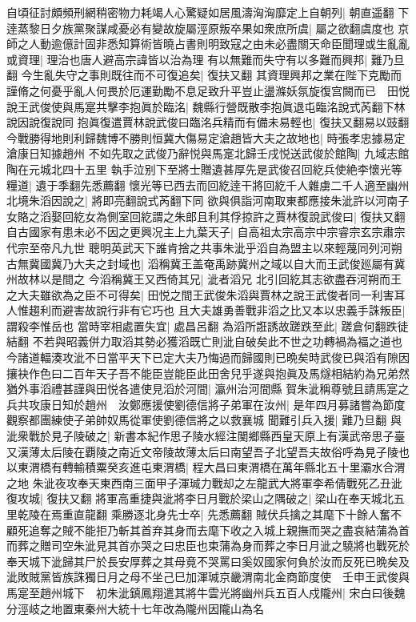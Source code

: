 自頃征討頗頻刑網稍密物力耗竭人心驚疑如居風濤洶洶靡定上自朝列|{
	朝直遥翻}
下逹蒸黎日夕族黨聚謀咸憂必有變故旋屬涇原叛卒果如衆庶所虞|{
	屬之欲翻虞度也}
京師之人動逾億計固非悉知算術皆曉占書則明致寇之由未必盡關天命臣聞理或生亂亂或資理|{
	理治也唐人避高宗諱皆以治為理}
有以無難而失守有以多難而興邦|{
	難乃旦翻}
今生亂失守之事則既往而不可復追矣|{
	復扶又翻}
其資理興邦之業在陛下克勵而謹脩之何憂乎亂人何畏於厄運勤勵不息足致升平豈止盪滌妖氛旋復宫闕而已　田悦說王武俊使與馬寔共擊李抱眞於臨洺|{
	魏縣行營既散李抱眞退屯臨洺說式芮翻下林說因說復說同}
抱眞復遣賈林說武俊曰臨洺兵精而有備未易輕也|{
	復扶又翻易以豉翻}
今戰勝得地則利歸魏博不勝則恒冀大傷易定滄趙皆大夫之故地也|{
	時張孝忠據易定滄康日知據趙州}
不如先取之武俊乃辭悦與馬寔北歸壬戌悦送武俊於館陶|{
	九域志館陶在元城北四十五里}
執手泣别下至將士贈遺甚厚先是武俊召回紇兵使絶李懷光等糧道|{
	遺于季翻先悉薦翻}
懷光等已西去而回紇逹干將回紇千人雜虜二千人適至幽州北境朱滔因說之|{
	將即亮翻說式芮翻下同}
欲與俱詣河南取東都應接朱泚許以河南子女賂之滔娶回紇女為側室回紇謂之朱郎且利其俘掠許之賈林復說武俊曰|{
	復扶又翻}
自古國家有患未必不因之更興况主上九葉天子|{
	自高祖太宗高宗中宗睿宗玄宗肅宗代宗至帝凡九世}
聰明英武天下誰肯捨之共事朱泚乎滔自為盟主以來輕蔑同列河朔古無冀國冀乃大夫之封域也|{
	滔稱冀王盖奄禹跡冀州之域以自大而王武俊廵屬有冀州故林以是間之}
今滔稱冀王又西倚其兄|{
	泚者滔兄}
北引回紇其志欲盡吞河朔而王之大夫雖欲為之臣不可得矣|{
	田悦之間王武俊朱滔與賈林之說王武俊者同一利害耳人惟趨利而避害故說行非有它巧也}
且大夫雄勇善戰非滔之比又本以忠義手誅叛臣|{
	謂殺李惟岳也}
當時宰相處置失宜|{
	處昌呂翻}
為滔所誑誘故蹉跌至此|{
	蹉倉何翻跌徒結翻}
不若與昭義併力取滔其勢必獲滔既亡則泚自破矣此不世之功轉禍為福之道也今諸道輻湊攻泚不日當平天下已定大夫乃悔過而歸國則已晩矣時武俊已與滔有隙因攘袂作色曰二百年天子吾不能臣豈能臣此田舍兒乎遂與抱眞及馬燧相結約為兄弟然猶外事滔禮甚謹與田悦各遣使見滔於河間|{
	瀛州治河間縣}
賀朱泚稱尊號且請馬寔之兵共攻康日知於趙州　汝鄭應援使劉德信將子弟軍在汝州|{
	是年四月募諸嘗為節度觀察都團練使子弟帥奴馬從軍使劉德信將之以救襄城}
聞難引兵入援|{
	難乃旦翻}
與泚衆戰於見子陵破之|{
	新書本紀作思子陵水經注閺鄉縣西皇天原上有漢武帝思子臺又漢薄太后陵在覇陵之南近文帝陵故薄太后曰南望吾子北望吾夫故俗呼為見子陵也}
以東渭橋有轉輸積粟癸亥進屯東渭橋|{
	程大昌曰東渭橋在萬年縣北五十里灞水合渭之地}
朱泚夜攻奉天東西南三面甲子渾瑊力戰却之左龍武大將軍李希倩戰死乙丑泚復攻城|{
	復扶又翻}
將軍高重捷與泚將李日月戰於梁山之隅破之|{
	梁山在奉天城北五里乾陵在焉重直龍翻}
乘勝逐北身先士卒|{
	先悉薦翻}
賊伏兵擒之其麾下十餘人奮不顧死追奪之賊不能拒乃斬其首弃其身而去麾下收之入城上親撫而哭之盡哀結蒲為首而葬之贈司空朱泚見其首亦哭之曰忠臣也束蒲為身而葬之李日月泚之驍將也戰死於奉天城下泚歸其尸於長安厚葬之其母竟不哭罵曰奚奴國家何負於汝而反死已晩矣及泚敗賊黨皆族誅獨日月之母不坐己巳加渾瑊京畿渭南北金商節度使　壬申王武俊與馬寔至趙州城下　初朱泚鎮鳳翔遣其將牛雲光將幽州兵五百人戍隴州|{
	宋白曰後魏分涇岐之地置東秦州大統十七年改為隴州因隴山為名}

